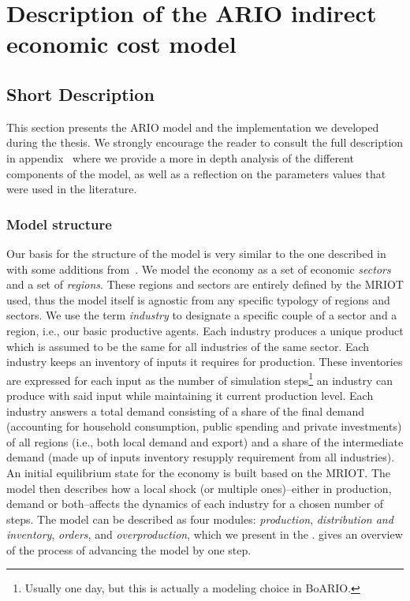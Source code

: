 \chapter{Description of the ARIO indirect economic cost model}\label{ch_boario}


\section{Short Description}
\label{sec:depth-descr-ario}

This section presents the ARIO model and the implementation we
developed during the thesis. We strongly encourage the reader to consult the full
description in appendix~ where we provide a more
in depth analysis of the different components of the model, as well as a
reflection on the parameters values that were used in the literature.

\subsection{Model structure}
\label{sec:model_struc}

Our basis for the structure of the model is very similar to the one described
in~\textcite{hallegatte-2013-model-role} with some additions
from~\textcite{guan-2020-global-suppl}. We model the economy as a set of economic \emph{sectors}
and a set of \emph{regions}. These regions and sectors are entirely defined by
the \acrfull{MRIOT} used, thus the model itself is agnostic from any specific
typology of regions and sectors. We use the term \emph{industry} to designate a
specific couple of a sector and a region, i.e., our basic productive agents.
Each industry produces a unique product which is assumed to be the same for all
industries of the same sector. Each industry keeps an inventory of inputs it
requires for production. These inventories are expressed for each
input as the number of simulation steps\footnote{Usually one day, but this is
  actually a modeling choice in BoARIO.} an industry can produce with said input
while maintaining it current production level. Each industry answers a total demand consisting of a
share of the final demand (accounting for household consumption, public spending
and private investments) of all regions (i.e., both local demand and export) and
a share of the intermediate demand (made up of inputs inventory resupply
requirement from all industries). An initial equilibrium state for the economy is built based on
the MRIOT. The model then describes how a local
shock (or multiple ones)--either in production, demand or both--affects the
dynamics of each industry for a chosen number of steps. The model can be
described as four modules: \emph{production}, \emph{distribution and inventory},
\emph{orders}, and \emph{overproduction}, which we present in the
.  gives an overview
of the process of advancing the model by one step.

